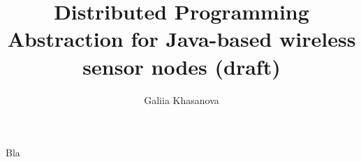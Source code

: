 \documentclass[msc, openright, a4paper]{TNthesis}
\title{Distributed Programming Abstraction for Java-based wireless sensor nodes
(draft)}
\author{Galiia Khasanova}
\begin{document}
 

\begin{preliminary}
\maketitle 
\begin{acknowledgements}
Bla
\end{acknowledgements}
\standarddeclaration
\tableofcontents
\listoffigures
\listoftables
\end{preliminary}  






\end{document}
